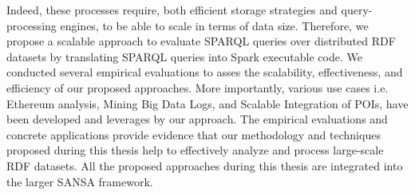 Indeed, these processes require, both efficient storage strategies and query-processing engines, to be able to scale in terms of data size.
Therefore, we propose a scalable approach to evaluate SPARQL queries over distributed RDF datasets by translating SPARQL queries into Spark executable code.
We conducted several empirical evaluations to asses the scalability, effectiveness, and efficiency of our proposed approaches.
More importantly, various use cases i.e. Ethereum analysis, Mining Big Data Logs, and Scalable Integration of POIs, have been developed and leverages by our approach. 
The empirical evaluations and concrete applications provide evidence that our methodology and techniques proposed during this thesis help to effectively analyze and process large-scale RDF datasets.
All the proposed approaches during this thesis are integrated into the larger SANSA framework.


